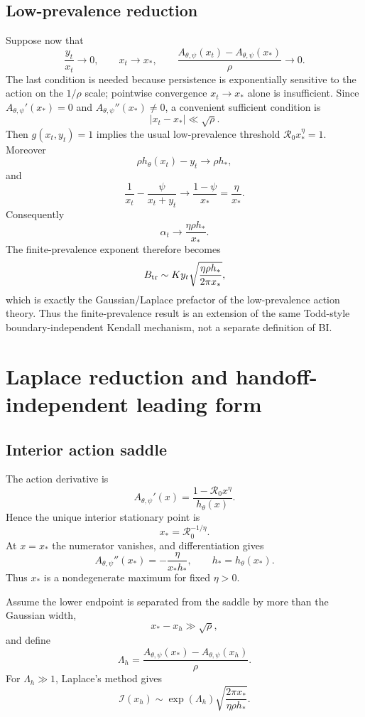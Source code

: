 \documentclass[11pt]{article}
\newcommand{\Rzero}{\mathcal R_0}
\newcommand{\hth}{h_\theta}
\newcommand{\Apsi}{A_{\theta,\psi}}
\newcommand{\xs}{x_*}
\begin{document}
\subsection{Low-prevalence reduction}
Suppose now that
\[
\frac{y_t}{x_t}\to0,
\qquad
x_t\to\xs,
\qquad
\frac{\Apsi(x_t)-\Apsi(\xs)}{\rho}\to0.
\]
The last condition is needed because persistence is exponentially sensitive to the action on the $1/\rho$ scale; pointwise convergence $x_t\to\xs$ alone is insufficient.  Since $\Apsi'(\xs)=0$ and $\Apsi''(\xs)\neq0$, a convenient sufficient condition is
\[
\boxed{|x_t-\xs|\ll\sqrt{\rho}.}
\]
Then $g(x_t,y_t)=1$ implies the usual low-prevalence threshold $\Rzero\xs^\eta=1$.  Moreover
\[
\rho\hth(x_t)-y_t\to\rho h_*,
\]
and
\[
\frac1{x_t}-\frac{\psi}{x_t+y_t}
\to\frac{1-\psi}{\xs}=\frac{\eta}{\xs}.
\]
Consequently
\[
\boxed{
\alpha_t\to\frac{\eta\rho h_*}{\xs}.
}
\]
The finite-prevalence exponent therefore becomes
\[
B_{\rm tr}
\sim K y_t\sqrt{\frac{\eta\rho h_*}{2\pi\xs}},
\]
which is exactly the Gaussian/Laplace prefactor of the low-prevalence action theory.  Thus the finite-prevalence result is an extension of the same Todd-style boundary-independent Kendall mechanism, not a separate definition of BI.

\section{Laplace reduction and handoff-independent leading form}
\label{sec:laplace}

\subsection{Interior action saddle}
The action derivative is
\[
\Apsi'(x)=\frac{1-\Rzero x^\eta}{\hth(x)}.
\]
Hence the unique interior stationary point is
\[
\boxed{\xs=\Rzero^{-1/\eta}.}
\]
At $x=\xs$ the numerator vanishes, and differentiation gives
\[
\boxed{
\Apsi''(\xs)
=-\frac{\eta}{\xs h_*},
\qquad
h_*=\hth(\xs).
}
\]
Thus $\xs$ is a nondegenerate maximum for fixed $\eta>0$.

Assume the lower endpoint is separated from the saddle by more than the Gaussian width,
\[
\xs-x_h\gg\sqrt\rho,
\]
and define
\[
\Lambda_h
=\frac{\Apsi(\xs)-\Apsi(x_h)}\rho.
\]
For $\Lambda_h\gg1$, Laplace's method gives
\[
\boxed{
\mathcal I(x_h)
\sim
\exp(\Lambda_h)
\sqrt{\frac{2\pi\xs}{\eta\rho h_*}}.
}
\]
\end{document}
